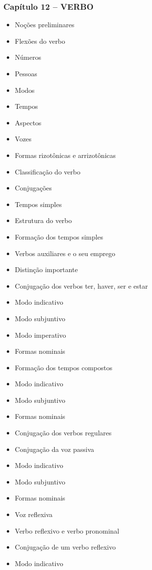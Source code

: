 \documentclass[a4paper,12pt]{article}[abntex2]
\begin{document}
\subsubsection*{Capítulo 12 – VERBO}
\begin{itemize}
    \item Noções preliminares
    \item Flexões do verbo
    \item Números
    \item Pessoas
    \item Modos
    \item Tempos
    \item Aspectos
    \item Vozes
    \item Formas rizotônicas e arrizotônicas
    \item Classificação do verbo
    \item Conjugações
    \item Tempos simples
    \item Estrutura do verbo
    \item Formação dos tempos simples
    \item Verbos auxiliares e o seu emprego
    \item Distinção importante
    \item Conjugação dos verbos ter, haver, ser e estar
    \item Modo indicativo
    \item Modo subjuntivo
    \item Modo imperativo
    \item Formas nominais
    \item Formação dos tempos compostos
    \item Modo indicativo
    \item Modo subjuntivo
    \item Formas nominais
    \item Conjugação dos verbos regulares
    \item Conjugação da voz passiva
    \item Modo indicativo
    \item Modo subjuntivo
    \item Formas nominais
    \item Voz reflexiva
    \item Verbo reflexivo e verbo pronominal
    \item Conjugação de um verbo reflexivo
    \item Modo indicativo

\end{itemize}
\end{document}
